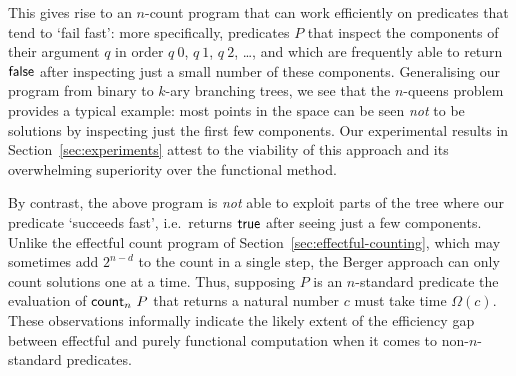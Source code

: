 \documentclass[12pt,phd,lfcs,twoside,openright,logo,leftchapter,normalheadings]{infthesis}
\theoremstyle{plain}
\theoremstyle{definition}
\begin{document}
This gives rise to an $n$-count program that can work efficiently on
predicates that tend to `fail fast': more specifically, predicates $P$
that inspect the components of their argument $q$ in order $q~0$,
$q~1$, $q~2$, \dots, and which are frequently able to return $\mathsf{false}$
after inspecting just a small number of these components. Generalising
our program from binary to $k$-ary branching trees, we see that the
$n$-queens problem provides a typical example: most points in the
space can be seen \emph{not} to be solutions by inspecting just the
first few components. Our experimental results in
Section~\ref{sec:experiments} attest to the viability of this approach
and its overwhelming superiority over the \naive functional method.

By contrast, the above program is \emph{not} able to exploit parts of
the tree where our predicate `succeeds fast', i.e.\ returns $\mathsf{true}$
after seeing just a few components.  Unlike the effectful count
program of Section~\ref{sec:effectful-counting}, which may sometimes
add $2^{n-d}$ to the count in a single step, the Berger approach can
only count solutions one at a time. Thus, supposing $P$ is an
$n$-standard predicate the evaluation of $\mathsf{count}_n~P$ that returns a
natural number $c$ must take time $\Omega(c)$. These observations
informally indicate the likely extent of the efficiency gap between
effectful and purely functional computation when it comes to
non-$n$-standard predicates.
%

\singlespace



\end{document}
